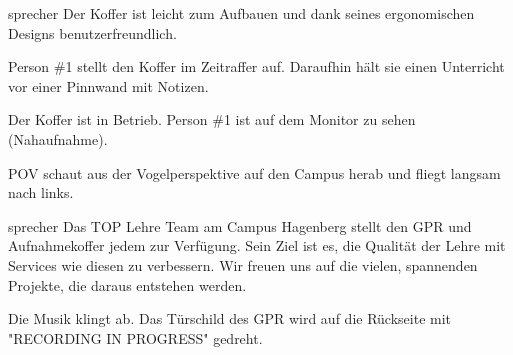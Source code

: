 \documentclass{screenplay}
\begin{document}
	\begin{dialogue}{sprecher}
		Der Koffer ist leicht zum Aufbauen und dank seines ergonomischen Designs benutzerfreundlich.
	\end{dialogue}
	
	
	Person \#1 stellt den Koffer im Zeitraffer auf. Daraufhin hält sie einen Unterricht vor einer Pinnwand mit Notizen.
	
	Der Koffer ist in Betrieb. Person \#1 ist auf dem Monitor zu sehen (Nahaufnahme).
	
	
	POV schaut aus der Vogelperspektive auf den Campus herab und fliegt langsam nach links.
	
	\begin{dialogue}{sprecher}
		Das TOP Lehre Team am Campus Hagenberg stellt den GPR und Aufnahmekoffer jedem zur Verfügung. Sein Ziel ist es, die Qualität der Lehre mit Services wie diesen zu verbessern. Wir freuen uns auf die vielen, spannenden Projekte, die daraus entstehen werden.
	\end{dialogue}
	
	
	Die Musik klingt ab. Das Türschild des GPR wird auf die Rückseite mit "RECORDING IN PROGRESS" gedreht.
	
	\fadeout
	\theend
\end{document}
